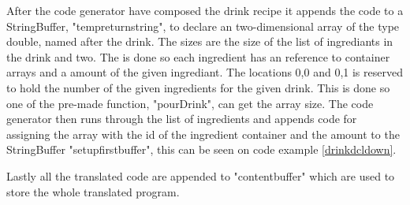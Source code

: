 After the code generator have composed the drink recipe it appends the code to a StringBuffer, "tempreturnstring", to declare an two-dimensional array of the type double, named after the drink. The sizes are the size of the list of ingrediants in the drink and two. The is done so each ingredient has an reference to container arrays and a amount of the given ingrediant. The locations 0,0 and 0,1 is reserved to hold the number of the given ingredients for the given drink. This is done so one of the pre-made function, "pourDrink", can get the array size. The code generator then runs through the list of ingredients and appends code for assigning the array with the id of the ingredient container and the amount to the StringBuffer "setupfirstbuffer", this can be seen on code example \ref{drinkdcldown}.

Lastly all the translated code are appended to "contentbuffer" which are used to store the whole translated program.